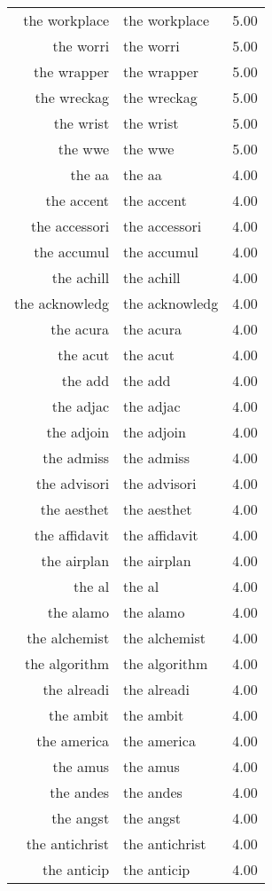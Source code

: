 \begin{table}[ht]
\begin{tabular}{rlr}
  the workplace & the workplace & 5.00 \\ 
  the worri & the worri & 5.00 \\ 
  the wrapper & the wrapper & 5.00 \\ 
  the wreckag & the wreckag & 5.00 \\ 
  the wrist & the wrist & 5.00 \\ 
  the wwe & the wwe & 5.00 \\ 
  the aa & the aa & 4.00 \\ 
  the accent & the accent & 4.00 \\ 
  the accessori & the accessori & 4.00 \\ 
  the accumul & the accumul & 4.00 \\ 
  the achill & the achill & 4.00 \\ 
  the acknowledg & the acknowledg & 4.00 \\ 
  the acura & the acura & 4.00 \\ 
  the acut & the acut & 4.00 \\ 
  the add & the add & 4.00 \\ 
  the adjac & the adjac & 4.00 \\ 
  the adjoin & the adjoin & 4.00 \\ 
  the admiss & the admiss & 4.00 \\ 
  the advisori & the advisori & 4.00 \\ 
  the aesthet & the aesthet & 4.00 \\ 
  the affidavit & the affidavit & 4.00 \\ 
  the airplan & the airplan & 4.00 \\ 
  the al & the al & 4.00 \\ 
  the alamo & the alamo & 4.00 \\ 
  the alchemist & the alchemist & 4.00 \\ 
  the algorithm & the algorithm & 4.00 \\ 
  the alreadi & the alreadi & 4.00 \\ 
  the ambit & the ambit & 4.00 \\ 
  the america & the america & 4.00 \\ 
  the amus & the amus & 4.00 \\ 
  the andes & the andes & 4.00 \\ 
  the angst & the angst & 4.00 \\ 
  the antichrist & the antichrist & 4.00 \\ 
  the anticip & the anticip & 4.00 \\ 

\end{tabular}
\end{table}
